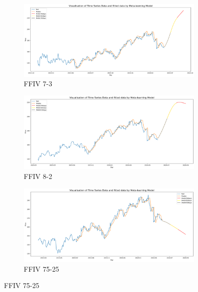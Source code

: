 \documentclass{ieeeojies}
\begin{document}
 \vspace{-10pt}
\begin{figure}[H]
    \centering
    \begin{subfigure}[b]{0.33\linewidth}
        \centering
        \includegraphics[width=\linewidth]{Meta-learning Plot/ML_FFIV_7_3.png}
        \caption{FFIV 7-3}
        \label{fig:ffiv-7-3}
    \end{subfigure}%
    \hfill
    \begin{subfigure}[b]{0.33\linewidth}
        \centering
        \includegraphics[width=\linewidth]{Meta-learning Plot/ML_FFIV_8_2.png}
        \caption{FFIV 8-2}
        \label{fig:ffiv-8-2}
    \end{subfigure}%
    \hfill
    \begin{subfigure}[b]{0.33\linewidth}
        \centering
        \includegraphics[width=\linewidth]{Meta-learning Plot/ML_FFIV_75_25.png}
        \caption{FFIV 75-25}
        \label{fig:ffiv-75-25}
    \end{subfigure}
\end{figure}
\end{document}
